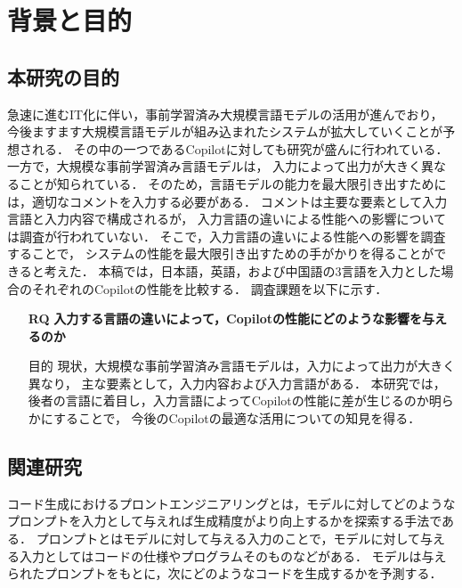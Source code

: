 \section{背景と目的\label{related_research}}

\subsection{本研究の目的}
  急速に進むIT化に伴い，事前学習済み大規模言語モデルの活用が進んでおり，
  今後ますます大規模言語モデルが組み込まれたシステムが拡大していくことが予想される．
  その中の一つであるCopilotに対しても研究が盛んに行われている\cite{Yao2022ACL}\cite{Nguyen2022MSR}\cite{Sobania2022GECCO}\cite{Dakhel2022arXiv}\cite{Vaithilingam2022CHI}．
  一方で，大規模な事前学習済み言語モデルは，
  入力によって出力が大きく異なることが知られている\cite{Yao2022ACL}．
  そのため，言語モデルの能力を最大限引き出すためには，適切なコメントを入力する必要がある．
  コメントは主要な要素として入力言語と入力内容で構成されるが，
  入力言語の違いによる性能への影響については調査が行われていない．
  そこで，入力言語の違いによる性能への影響を調査することで，
  システムの性能を最大限引き出すための手がかりを得ることができると考えた．
  本稿では，日本語，英語，および中国語の3言語を入力とした場合のそれぞれのCopilotの性能を比較する．
  調査課題を以下に示す．

  
  \begin{itemize}
    \item[\textbf{RQ}] \textbf{入力する言語の違いによって，Copilotの性能にどのような影響を与えるのか}
      \item[目的]{
      現状，大規模な事前学習済み言語モデルは，入力によって出力が大きく異なり，
      主な要素として，入力内容および入力言語がある．
      本研究では，後者の言語に着目し，入力言語によってCopilotの性能に差が生じるのか明らかにすることで，
      今後のCopilotの最適な活用についての知見を得る．}
  \end{itemize}

\subsection{関連研究}
  コード生成におけるプロントエンジニアリングとは，モデルに対してどのようなプロンプトを入力として与えれば生成精度がより向上するかを探索する手法である．
  プロンプトとはモデルに対して与える入力のことで，モデルに対して与える入力としてはコードの仕様やプログラムそのものなどがある．
  モデルは与えられたプロンプトをもとに，次にどのようなコードを生成するかを予測する．
  
